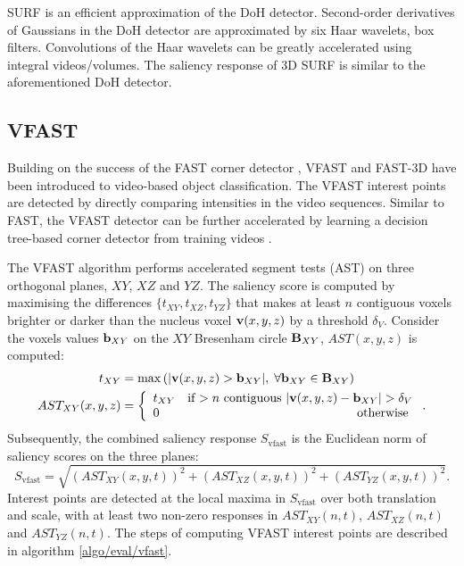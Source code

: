 SURF is an efficient approximation of the DoH detector. Second-order derivatives of Gaussians in the DoH detector are approximated by six Haar wavelets, \ie box filters. Convolutions of the Haar wavelets can be greatly accelerated using integral videos/volumes. The saliency response of 3D SURF is similar to the aforementioned DoH detector. 

\subsection{VFAST}
\label{sec/eval/vfast}

Building on the success of the FAST corner detector \cite{Rosten2010}, VFAST \cite{Yu2010} and FAST-3D \cite{Koelstra2009} have been introduced to video-based object classification. 
The VFAST interest points are detected by directly comparing intensities in the video sequences. Similar to FAST, the VFAST detector can be further accelerated by learning a decision tree-based corner detector from training videos \cite{Rosten2010}. 

The VFAST algorithm performs accelerated segment tests (AST) on three orthogonal planes, $XY$, $XZ$ and $YZ$. The saliency score is computed by maximising the differences $\{ t_{XY}, t_{XZ}, t_{YZ} \}$ that makes at least $n$ contiguous voxels brighter or darker than the nucleus voxel $\mathbf{v}(x,y,z)$ by a threshold $\delta_{V}$. Consider the voxels values $\mathbf{b}_{XY}$ on the $XY$ Bresenham circle $\mathbf{B}_{XY}$, $AST(x,y,z)$ is computed:  
\begin{align}
	t_{XY} & = \max\left(| \mathbf{v}(x,y,z) > \mathbf{b}_{XY}|,\;\forall \mathbf{b}_{XY} \in \mathbf{B}_{XY} \right)\\ 
AST_{XY}(x,y,z) & = \left\{
\begin{array}{lr}
	t_{XY} & \mbox{if $> n$ contiguous } |\mathbf{v}(x,y,z) - \mathbf{b}_{XY}| > \delta_{V} \\
	0 & \mbox{ otherwise }
\end{array}
\right..
\label{eqn/eval/fastast}
\end{align}
Subsequently, the combined saliency response $S_{\textrm{vfast}}$ is the Euclidean norm of saliency scores on the three planes: 
\begin{equation}
S_\textrm{vfast} = \sqrt{ \left(AST_{XY}(x,y,t)\right)^2+ \left(AST_{XZ}(x,y,t)\right)^2+ \left(AST_{YZ}(x,y,t)\right)^2}.
\label{eqn/eval/fastverall}
\end{equation}
Interest points are detected at the local maxima in $S_{\textrm{vfast}}$ over both translation and scale, with at least two non-zero responses in $AST_{XY}(n,t)$, $AST_{XZ}(n,t)$ and $AST_{YZ}(n,t)$. The steps of computing VFAST interest points are described in algorithm \ref{algo/eval/vfast}. 

